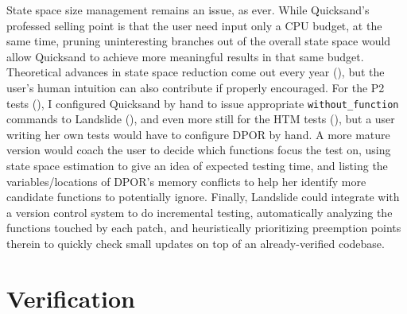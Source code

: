 State space size management remains an issue, as ever.
While Quicksand's professed selling point is that the user need input only a CPU budget,
at the same time,
pruning uninteresting branches out of the overall state space
would allow Quicksand to achieve more meaningful results in that same budget.
Theoretical advances in state space reduction come out every year (\sect{\ref{sec:related-algs}}),
but the user's human intuition can also contribute if properly encouraged.
For the P2 tests (\sect{\ref{sec:education-pebbles-tests}}),
I configured Quicksand by hand to issue appropriate {\tt without\_function} commands to Landslide
(\sect{\ref{sec:landslide-pps}}),
and even more still for the HTM tests (\sect{\ref{sec:tm-eval-exp-setup}}),
but a user writing her own tests would have to configure DPOR by hand.
A more mature version would coach the user to decide which functions focus the test on,
using state space estimation to give an idea of expected testing time,
and listing the variables/locations of DPOR's memory conflicts
to help her identify more candidate functions to potentially ignore.
Finally, Landslide could integrate with a version control system to do incremental testing,
automatically analyzing the functions touched by each patch,
and heuristically prioritizing preemption points therein
to quickly check small updates on top of an already-verified codebase.

\section{Verification}

